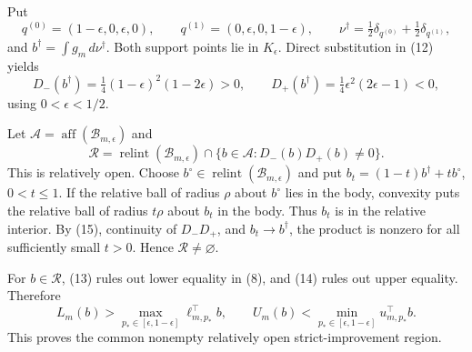 Put
\[
 q^{(0)}=(1-\epsilon,0,\epsilon,0),
 \qquad q^{(1)}=(0,\epsilon,0,1-\epsilon),
 \qquad \nu^{\dagger}=\tfrac12\delta_{q^{(0)}}+\tfrac12\delta_{q^{(1)}},
\]
and \(b^{\dagger}=\int g_m\,d\nu^{\dagger}\).  Both support points lie in \(K_{\epsilon}\).  Direct substitution in (12) yields
\[
 D_-(b^{\dagger})=\tfrac14(1-\epsilon)^2(1-2\epsilon)>0,
 \qquad
 D_+(b^{\dagger})=\tfrac14\epsilon^2(2\epsilon-1)<0,
\tag{15}
\]
using \(0<\epsilon<1/2\).

Let \(\mathcal A=\operatorname{aff}(\mathcal B_{m,\epsilon})\) and
\[
 \mathcal R=\operatorname{relint}(\mathcal B_{m,\epsilon})
 \cap\{b\in\mathcal A:D_-(b)D_+(b)\neq0\}.
\tag{16}
\]
This is relatively open.  Choose \(b^{\circ}\in\operatorname{relint}(\mathcal B_{m,\epsilon})\) and put \(b_t=(1-t)b^{\dagger}+tb^{\circ}\), \(0<t\leq1\).  If the relative ball of radius \(\rho\) about \(b^{\circ}\) lies in the body, convexity puts the relative ball of radius \(t\rho\) about \(b_t\) in the body.  Thus \(b_t\) is in the relative interior.  By (15), continuity of \(D_-D_+\), and \(b_t\to b^{\dagger}\), the product is nonzero for all sufficiently small \(t>0\).  Hence \(\mathcal R\neq\varnothing\).

For \(b\in\mathcal R\), (13) rules out lower equality in (8), and (14) rules out upper equality.  Therefore
\[
 L_m(b)>\max_{p_*\in[\epsilon,1-\epsilon]}\ell_{m,p_*}^{\top}b,
 \qquad
 U_m(b)<\min_{p_*\in[\epsilon,1-\epsilon]}u_{m,p_*}^{\top}b.
\]
This proves the common nonempty relatively open strict-improvement region.